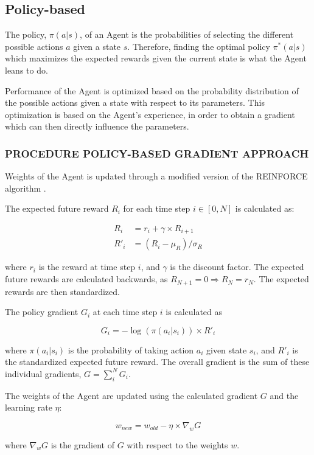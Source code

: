 \documentclass{article}
\renewenvironment{leftbar}[1][\hsize]{
    \def\FrameCommand{{\color{barcolor}\vrule width 0.5pt \hspace{10pt}}}
    \MakeFramed{\hsize#1 \advance\hsize-\width \FrameRestore}
}{\endMakeFramed}
\begin{document}
\subsection*{Policy-based}
\begin{leftbar}
    The policy, $\pi(a|s)$, of an Agent is the probabilities of selecting the different possible actions $a$ given a state $s$. Therefore, finding the optimal policy $\pi^*(a|s)$ which maximizes the expected rewards given the current state is what the Agent leans to do. \cite{HF-approaches}

    Performance of the Agent is optimized based on the probability distribution of the possible actions given a state with respect to its parameters. This optimization is based on the Agent's experience, in order to obtain a gradient which can then directly influence the parameters. \cite{HF-policy}

    \hypertarget{sec:policy-based-approach}{}
    \subsubsection*{PROCEDURE \hfill POLICY-BASED GRADIENT APPROACH}

    Weights of the Agent is updated through a modified version of the REINFORCE algorithm \cite{REINFORCE}.

    The expected future reward $R_i$ for each time step $i \in [0, N]$ is calculated as:

    \begin{equation}
        \begin{split}
            R_i &= r_i + \gamma \times R_{i+1} \\
            R'_i &= (R_i - \mu_R) / \sigma_R
        \end{split} \label{eq:reward}
    \end{equation}

    where $r_i$ is the reward at time step $i$, and $\gamma$ is the discount factor. The expected future rewards are calculated backwards, as $R_{N+1} = 0 \Rightarrow R_N = r_N$. The expected rewards are then standardized.

    The policy gradient $G_i$ at each time step $i$ is calculated as

    \begin{equation}
        G_i = - \log(\pi(a_i|s_i)) \times R'_i
    \end{equation}

    where $\pi(a_i|s_i)$ is the probability of taking action $a_i$ given state $s_i$, and $R'_i$ is the standardized expected future reward. The overall gradient is the sum of these individual gradients, $G = \sum_{i}^N G_i$.

    The weights of the Agent are updated using the calculated gradient $G$ and the learning rate $\eta$:

    \begin{equation}
        w_{new} = w_{old} - \eta \times \nabla_w G
    \end{equation}

    where $\nabla_w G$ is the gradient of $G$ with respect to the weights $w$.

\end{leftbar}
\end{document}
